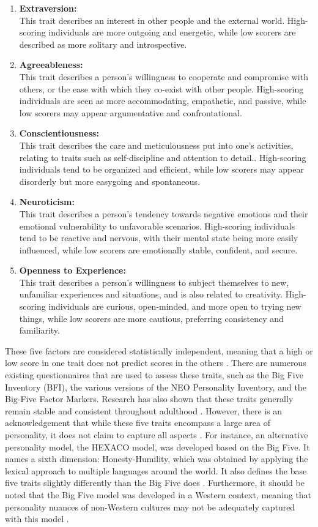 \begin{enumerate}
	\item \textbf{Extraversion:} \\
	This trait describes an interest in other people and the external world. High-scoring individuals are more outgoing and energetic, while low scorers are described as more solitary and introspective. 
	\item \textbf{Agreeableness:} \\
 	This trait describes a person’s willingness to cooperate and compromise with others, or the ease with which they co-exist with other people. High-scoring individuals are seen as more accommodating, empathetic, and passive, while low scorers may appear argumentative and confrontational. 
	\item \textbf{Conscientiousness:} \\
	This trait describes the care and meticulousness put into one’s activities, relating to traits such as self-discipline and attention to detail.. High-scoring individuals tend to be organized and efficient, while low scorers may appear disorderly but more easygoing and spontaneous.
	\item \textbf{Neuroticism:} \\
	This trait describes a person’s tendency towards negative emotions and their emotional vulnerability to unfavorable scenarios. High-scoring individuals tend to be reactive and nervous, with their mental state being more easily influenced, while low scorers are emotionally stable, confident, and secure.
	\item \textbf{Openness to Experience:} \\
	This trait describes a person’s willingness to subject themselves to new, unfamiliar experiences and situations, and is also related to creativity. High-scoring individuals are curious, open-minded, and more open to trying new things, while low scorers are more cautious, preferring consistency and familiarity. 
\end{enumerate}

These five factors are considered statistically independent, meaning that a high or low score in one trait does not predict scores in the others \citep{babcock2020big}. There are numerous existing questionnaires that are used to assess these traits, such as the Big Five Inventory (BFI), the various versions of the NEO Personality Inventory, and the Big-Five Factor Markers. Research has also shown that these traits generally remain stable and consistent throughout adulthood \citep{babcock2020big}. However, there is an acknowledgement that while these five traits encompass a large area of personality, it does not claim to capture all aspects \citep{babcock2020big}. For instance, an alternative personality model, the HEXACO model, was developed based on the Big Five. It names a sixth dimension: Honesty-Humility, which was obtained by applying the lexical approach to multiple languages around the world. It also defines the base five traits slightly differently than the Big Five does \citep{feher2021looking}. Furthermore, it should be noted that the Big Five model was developed in a Western context, meaning that personality nuances of non-Western cultures may not be adequately captured with this model \citep{feher2021looking}.
